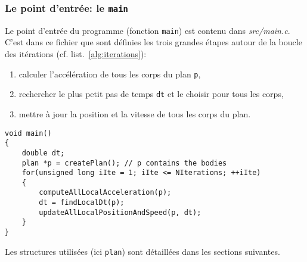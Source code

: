 \subsubsection{Le point d'entrée: le \texttt{main}}
Le point d'entrée du programme (fonction \texttt{main}) est contenu dans \textit{src/main.c}.
C'est dans ce fichier que sont définies les trois grandes étapes autour de la boucle des itérations (cf. list.~\ref{alg:iterations}):
\begin{enumerate}
\item calculer l'accélération de tous les corps du plan \texttt{p},
\item rechercher le plus petit pas de temps \texttt{dt} et le choisir pour tous les corps,
\item mettre à jour la position et la vitesse de tous les corps du plan.
\end{enumerate}
\begin{lstlisting}[caption={Code simplifié du calcul par itération},label={alg:iterations}]
void main()
{
	double dt;
	plan *p = createPlan(); // p contains the bodies
	for(unsigned long iIte = 1; iIte <= NIterations; ++iIte) 
	{
		computeAllLocalAcceleration(p);
		dt = findLocalDt(p);
		updateAllLocalPositionAndSpeed(p, dt);
	}
}
\end{lstlisting}
Les structures utilisées (ici \texttt{plan}) sont détaillées dans les sections suivantes.

